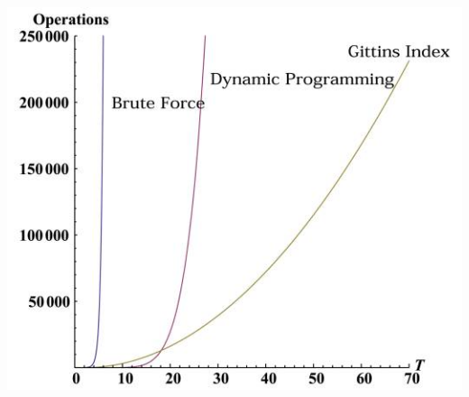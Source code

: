 \documentclass[12pt, aspectratio=169, mathserif]{beamer}
\begin{document}
  \begin{frame}
    \begin{center}
      \includegraphics[height=\textheight]{DP.jpeg}
    \end{center}
  \end{frame}
\end{document}
